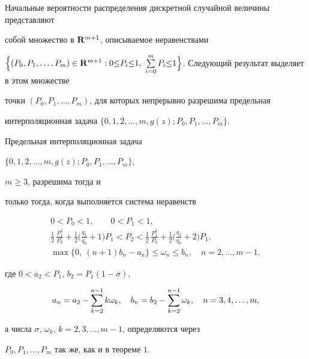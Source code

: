 Начальные вероятности распределения дискретной случайной величины представляют


собой множество в $\bold R^{m+1}$, описываемое неравенствами


$\Big\{(P_0, P_1,\dotsc,P_m)\in  \bold R^{m+1}:0{\leq} P_i{\leq} 1,


\ \Su {i=0}^{m}P_i{\leq} 1\Big\}$. Следующий результат выделяет в этом множестве


точки $(P_0, P_1, \dotsc,P_m)$, для которых непрерывно разрешима предельная


интерполяционная задача $\{0, 1, 2, \dotsc, m, g(z); P_0, P_1,\dotsc,P_m\}$.








\begin{thm}


Предельная интерполяционная задача


$\{0, 1, 2, \dotsc, m, g(z); P_0, P_1, \dotsc, P_m\}$,\linebreak


$m\geq 3$, разрешима тогда и


только тогда, когда выполняется система неравенств


\begin{gather*}


0<P_0<1, \quad  \quad 0<P_1<1,\\


%


\frac 1{2}\, \frac {P_1^2}{P_0}+ \frac 1{2}


\bigg(\frac {q_1}{q_0}+1\bigg)P_1


<P_2<\frac 1{2}\, \frac {P_1^2}{P_0}+ \frac 1{2}


\bigg(\frac {q_1}{q_0}+2\bigg)P_1, \\


%


\max\{0,\  (n+1)b_n-a_n\}\leq \omega_n\leq b_n,\quad  n=2, \dotsc, m-1,


\end{gather*}


где $0<a_2<P_1$, $b_2=P_1(1-\sigma )$,


$$


a_n=a_2-\Su {k=2}^{n-1}k\omega_k,\quad b_n=b_2-\Su {k=2}^{n-1}\omega_k,\quad


n=3, 4, \dotsc, m,


$$


а числа $\sigma$, $\omega_k$, $k=2, 3, \dotsc, m-1$, определяются через


$P_0, P_1, \dotsc, P_m$ так же, как и в теореме $1$.


\end{thm}





